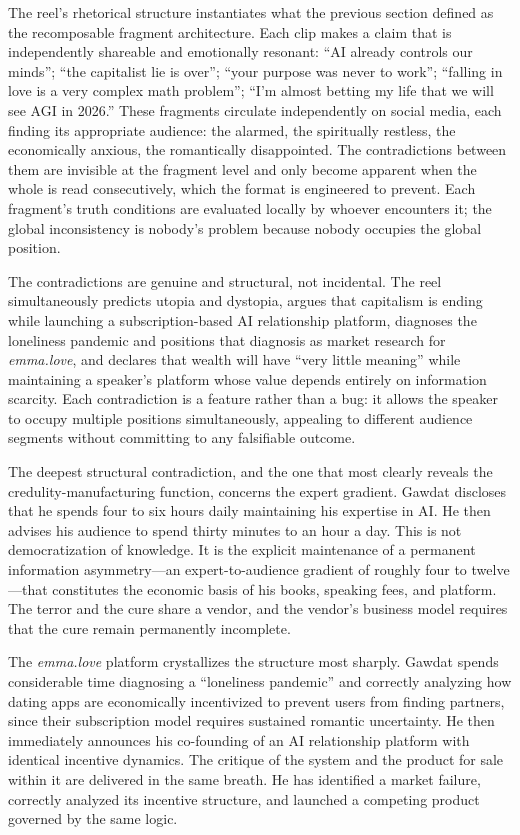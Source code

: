 \documentclass[12pt, a4paper]{article}
\begin{document}
The reel's rhetorical structure instantiates what the previous section defined as the recomposable
fragment architecture. Each clip makes a claim that is independently shareable and emotionally
resonant: ``AI already controls our minds''; ``the capitalist lie is over''; ``your purpose was
never to work''; ``falling in love is a very complex math problem''; ``I'm almost betting my life
that we will see AGI in 2026.'' These fragments circulate independently on social media, each
finding its appropriate audience: the alarmed, the spiritually restless, the economically anxious,
the romantically disappointed. The contradictions between them are invisible at the fragment level
and only become apparent when the whole is read consecutively, which the format is engineered to
prevent. Each fragment's truth conditions are evaluated locally by whoever encounters it; the global
inconsistency is nobody's problem because nobody occupies the global position.

The contradictions are genuine and structural, not incidental. The reel simultaneously predicts
utopia and dystopia, argues that capitalism is ending while launching a subscription-based AI
relationship platform, diagnoses the loneliness pandemic and positions that diagnosis as market
research for \textit{emma.love}, and declares that wealth will have ``very little meaning'' while
maintaining a speaker's platform whose value depends entirely on information scarcity. Each
contradiction is a feature rather than a bug: it allows the speaker to occupy multiple positions
simultaneously, appealing to different audience segments without committing to any falsifiable
outcome.

The deepest structural contradiction, and the one that most clearly reveals the
credulity-manufacturing function, concerns the expert gradient. Gawdat discloses that he spends
four to six hours daily maintaining his expertise in AI. He then advises his audience to spend
thirty minutes to an hour a day. This is not democratization of knowledge. It is the explicit
maintenance of a permanent information asymmetry---an expert-to-audience gradient of roughly four
to twelve---that constitutes the economic basis of his books, speaking fees, and platform. The
terror and the cure share a vendor, and the vendor's business model requires that the cure remain
permanently incomplete.

The \textit{emma.love} platform crystallizes the structure most sharply. Gawdat spends considerable
time diagnosing a ``loneliness pandemic'' and correctly analyzing how dating apps are economically
incentivized to prevent users from finding partners, since their subscription model requires
sustained romantic uncertainty. He then immediately announces his co-founding of an AI relationship
platform with identical incentive dynamics. The critique of the system and the product for sale
within it are delivered in the same breath. He has identified a market failure, correctly analyzed
its incentive structure, and launched a competing product governed by the same logic.
\end{document}
